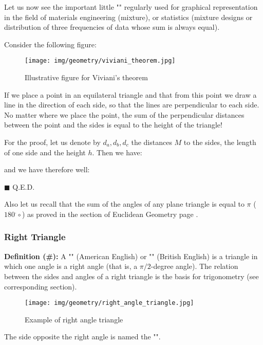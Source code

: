 {	Let us now see the important little "" regularly used for graphical representation in the field of materials engineering (mixture), or statistics (mixture designs or distribution of three frequencies of data whose sum is always equal).
	
	Consider the following figure:
	\begin{figure}[H]
		\centering
		\texttt{[image: img/geometry/viviani\_theorem.jpg]}
		\caption{Illustrative figure for Viviani's theorem}
	\end{figure}
	\begin{theorem}
	If we place a point in an equilateral triangle and that from this point we draw a line in the direction of each side, so that the lines are perpendicular to each side. No matter where we place the point, the sum of the perpendicular distances between the point and the sides is equal to the height of the triangle!
	\end{theorem}
	\begin{dem}
	For the proof, let us denote by $d_a,d_b,d_c$ the distances $M$ to the sides, the length of one side and the height $h$. Then we have:
	
	and we have therefore well:
	
	\begin{flushright}
		$\blacksquare$  Q.E.D.
	\end{flushright}
	\end{dem} 
	Also let us recall that the sum of the angles of any plane triangle is equal to $\pi$ ($180^.\circ$) as proved in the section of Euclidean Geometry page \pageref{angle sum theorem}.
	
	\subsubsection{Right Triangle}
	\textbf{Definition (\#\mydef):} A "" (American English) or "" (British English) is a triangle in which one angle is a right angle (that is, a $\pi/2$-degree angle). The relation between the sides and angles of a right triangle is the basis for trigonometry (see corresponding section).
	\begin{figure}[H]
		\centering
		\texttt{[image: img/geometry/right\_angle\_triangle.jpg]}
		\caption{Example of right angle triangle}
	\end{figure}
	The side opposite the right angle is named the "".
	
}
